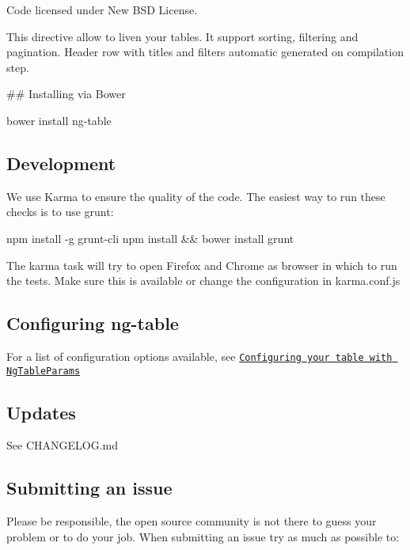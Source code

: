 \href{https://travis-ci.org/esvit/ng-table}{\tt } \href{https://coveralls.io/r/esvit/ng-table}{\tt }

Code licensed under New B\+SD License.

This directive allow to liven your tables. It support sorting, filtering and pagination. Header row with titles and filters automatic generated on compilation step.

\#\# Installing via Bower 
\begin{DoxyCode}
bower install ng-table
\end{DoxyCode}


\subsection*{Development}

We use Karma to ensure the quality of the code. The easiest way to run these checks is to use grunt\+:


\begin{DoxyCode}
npm install -g grunt-cli
npm install && bower install
grunt
\end{DoxyCode}


The karma task will try to open Firefox and Chrome as browser in which to run the tests. Make sure this is available or change the configuration in {\ttfamily karma.\+conf.\+js}

\subsection*{Configuring ng-\/table}

For a list of configuration options available, see \href{https://github.com/esvit/ng-table/wiki/Configuring-your-table-with-ngTableParams}{\tt Configuring your table with Ng\+Table\+Params}

\subsection*{Updates}

See C\+H\+A\+N\+G\+E\+L\+O\+G.\+md

\subsection*{Submitting an issue}

Please be responsible, the open source community is not there to guess your problem or to do your job. When submitting an issue try as much as possible to\+:


